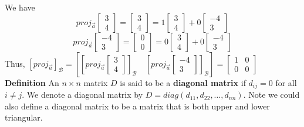 \documentclass[10pt,letter]{article}
\begin{document}
We have $$proj_{\vec{a}}\begin{bmatrix}3\\4\end{bmatrix}=\begin{bmatrix}3\\4\end{bmatrix}=1\begin{bmatrix}3\\4\end{bmatrix}+0\begin{bmatrix}-4\\3\end{bmatrix}$$ $$proj_{\vec{a}}\begin{bmatrix}-4\\3\end{bmatrix}=\begin{bmatrix}0\\0\end{bmatrix}=0\begin{bmatrix}3\\4\end{bmatrix}+0\begin{bmatrix}-4\\3\end{bmatrix}$$ Thus, $[proj_{\vec{a}}]_\mathcal{B}=\left[\left[proj_{\vec{a}}\begin{bmatrix}3\\4\end{bmatrix}\right]_\mathcal{B}\quad\left[proj_{\vec{a}}\begin{bmatrix}-4\\3\end{bmatrix}\right]_\mathcal{B}\right]=\begin{bmatrix}1&0\\0&0\end{bmatrix}$ \\ 
\textbf{Definition} An $n\times n$ matrix $D$ is said to be a \textbf{diagonal matrix} if $d_{ij}=0$ for all $i\neq j$. We denote a diagonal matrix by $D=diag(d_{11},d_{22},\ldots,d_{nn})$. Note we could also define a diagonal matrix to be a matrix that is both upper and lower triangular. 
\end{document}
